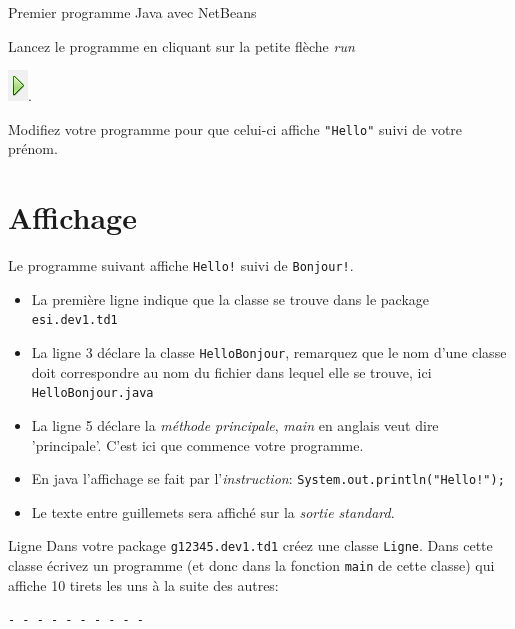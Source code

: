 \documentclass[a4paper,11pt]{article}
\begin{document}
\begin{Tutoriel}{Premier programme Java avec NetBeans}
\begin{steps}
		\item Lancez le programme en cliquant sur la petite flèche \emph{run} 
			
			\includegraphics{images/nb_newproject_run}.

		\item Modifiez votre programme pour que celui-ci affiche \texttt{"Hello"} suivi de votre prénom.

	\end{steps}

	\end{Tutoriel}

\section{Affichage}

	Le programme suivant affiche \texttt{Hello!} suivi de \texttt{Bonjour!}.

	\begin{itemize}
		\item La première ligne indique que la classe se trouve dans le package \texttt{esi.dev1.td1}
		\item La ligne 3 déclare la classe \texttt{HelloBonjour}, remarquez que le nom d'une classe 
			doit correspondre au nom du fichier dans lequel elle se trouve, ici \texttt{HelloBonjour.java}
		\item La ligne 5 déclare la \emph{méthode principale}, \emph{main} en anglais veut dire 'principale'.
			C'est ici que commence votre programme.
		\item En java l'affichage se fait par l'\emph{instruction}: \texttt{System.out.println("Hello!");}
		\item Le texte entre guillemets sera affiché sur la \emph{sortie standard}.
	\end{itemize}


	\begin{Exercice}{Ligne}
		Dans votre package \texttt{g12345.dev1.td1} créez une classe \texttt{Ligne}.
		Dans cette classe écrivez un programme  (et donc dans la fonction \texttt{main} de cette classe) 
		qui affiche 10 tirets les uns à la suite des autres:

		\texttt{- - - - - - - - - -}
	\end{Exercice}
	
\end{document}

